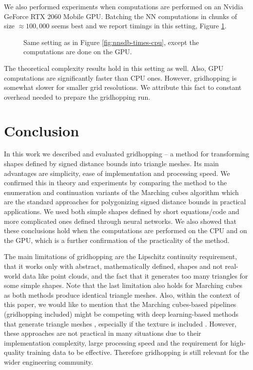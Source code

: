 \documentclass[11pt,twocolumn]{article}
\begin{document}
		We also performed experiments when computations are performed on an Nvidia GeForce RTX 2060 Mobile GPU.
		Batching the NN computations in chunks of size $\approx 100,000$ seems best and we report timings in this setting, Figure \ref{fig:nnsdb-times-gpu}.
		\begin{figure}
			\centering
			\resizebox{1.0\textwidth}{!}
			{
			
			}
			\resizebox{1.0\textwidth}{!}
			{
			
			}
			\caption
			{
				Same setting as in Figure \ref{fig:nnsdb-times-cpu}, except the computations are done on the GPU.
			}
			\label{fig:nnsdb-times-gpu}
		\end{figure}
		The theoretical complexity results hold in this setting as well.
		Also, GPU computations are significantly faster than CPU ones.
		However, gridhopping is somewhat slower for smaller grid resolutions.
		We attribute this fact to constant overhead needed to prepare the gridhopping run.

	\section{Conclusion}\label{sec:conclusion}
		In this work we described and evaluated gridhopping -- a method for transforming shapes defined by signed distance bounds into triangle meshes.
		Its main advantages are simplicity, ease of implementation and processing speed.
        We confirmed this in theory and experiments by comparing the method to the enumeration and continuation variants of the Marching cubes algorithm \cite{LorensenCline87marchingcubes} which are the standard approaches for polygonizing signed distance bounds in practical applications.
        We used both simple shapes defined by short equations/code and more complicated ones defined through neural networks.
        We also showed that these conclusions hold when the computations are performed on the CPU and on the GPU, which is a further confirmation of the practicality of the method.

		The main limitations of gridhopping are the Lipschitz continuity requirement, that it works only with abstract, mathematically defined, shapes and not real-world data like point clouds, and the fact that it generates too many triangles for some simple shapes.
        Note that the last limitation also holds for Marching cubes as both methods produce identical triangle meshes.
        Also, within the context of this paper, we would like to mention that the Marching cubes-based pipelines (gridhopping included) might be competing with deep learning-based methods that generate triangle meshes \cite{siddiqui2023meshgpt,alliegro2023polydiff}, especially if the texture is included \cite{gao2022get3d}.
        However, these approaches are not practical in many situations due to their implementation complexity, large processing speed and the requirement for high-quality training data to be effective.
        Therefore gridhopping is still relevant for the wider engineering community.
\end{document}
